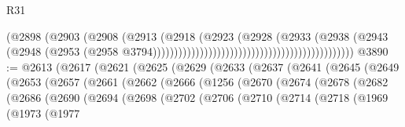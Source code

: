 \begin{lexlean}{R31}
\begin{coremodule}
                                                                        (@2898
                                                                          (@2903
                                                                            (@2908
                                                                              (@2913
                                                                                (@2918
                                                                                  (@2923
                                                                                    (@2928
                                                                                      (@2933
                                                                                        (@2938
                                                                                          (@2943
                                                                                            (@2948
                                                                                              (@2953
                                                                                                (@2958
                                                                                                  @3794)))))))))))))))))))))))))))))))))))))))))))))))
@3890 := @2613
    (@2617
      (@2621
        (@2625
          (@2629
            (@2633
              (@2637
                (@2641
                  (@2645
                    (@2649
                      (@2653
                        (@2657
                          (@2661
                            (@2662
                              (@2666
                                (@1256
                                  (@2670
                                    (@2674
                                      (@2678
                                        (@2682
                                          (@2686
                                            (@2690
                                              (@2694
                                                (@2698
                                                  (@2702
                                                    (@2706
                                                      (@2710
                                                        (@2714
                                                          (@2718
                                                            (@1969
                                                              (@1973
                                                                (@1977

\end{coremodule}
\end{lexlean}

